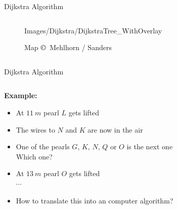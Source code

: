 \begin{frame}{Dijkstra Algorithm}
\begin{columns}
\begin{column}{0.45\linewidth}
\begin{figure}[!t]
          {Images/Dijkstra/DijkstraTree_WithOverlay}
        \vspace{-0.5em}
        \caption{Map $\copyright\,$ Mehlhorn / Sanders}
      \end{figure}
    \end{column}
  \end{columns}
\end{frame}


\begin{frame}{Dijkstra Algorithm}
  \vspace{-1.5em}
  \begin{columns}
    \begin{column}{0.55\linewidth}
      \textbf{Example:}
      \begin{itemize}
        \item
          At $\SI{11}{m}$ pearl {\color{Mittel-Blau}$L$} gets lifted
        \item
          The wires to {\color{Mittel-Blau}$N$} and {\color{Mittel-Blau}$K$}
          are now in the air
        \item
          One of the pearls {\color{Mittel-Blau}$G$}, {\color{Mittel-Blau}$K$},
          {\color{Mittel-Blau}$N$}, {\color{Mittel-Blau}$Q$} or
          {\color{Mittel-Blau}$O$} is the next one\\
          {\color{gray}Which one?}
        \item
          At $\SI{13}{m}$ pearl {\color{Mittel-Blau}$O$} gets lifted\\
          $\cdots$
        \item
          {\color{gray}How to translate this into an computer algorithm?}
      \end{itemize}
    \end{column}
    \begin{column}{0.45\linewidth}
      \begin{figure}[!t]

\end{figure}
\end{column}
\end{columns}
\end{frame}
